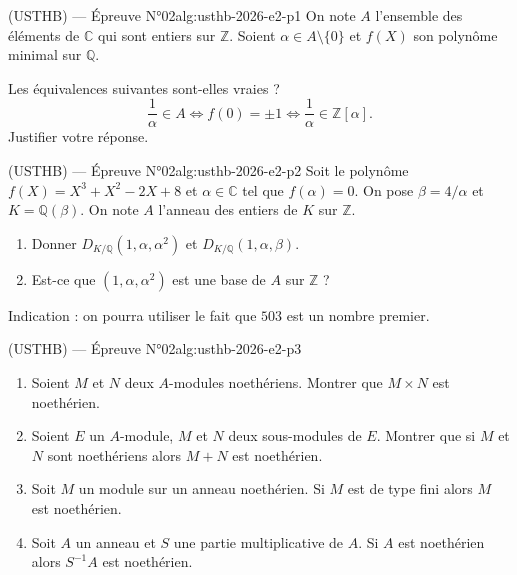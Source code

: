 \newpage

\begin{problem}{(USTHB) — Épreuve N°02}{alg:usthb-2026-e2-p1}
On note $A$ l'ensemble des éléments de $\mathbb{C}$ qui sont entiers sur
$\mathbb{Z}$. Soient $\alpha\in A\setminus\{0\}$ et $f(X)$ son polynôme minimal sur
$\mathbb{Q}$.

Les équivalences suivantes sont-elles vraies ?
$$
\frac1\alpha\in A\Longleftrightarrow f(0)=\pm1\Longleftrightarrow\frac1\alpha\in\mathbb{Z}[\alpha].
$$
Justifier votre réponse.

\end{problem}

\newpage

\begin{problem}{(USTHB) — Épreuve N°02}{alg:usthb-2026-e2-p2}
Soit le polynôme $f(X)=X^3+X^2-2X+8$ et $\alpha\in\mathbb{C}$ tel que
$f(\alpha)=0$. On pose $\beta=4/\alpha$ et $K=\mathbb{Q}(\beta)$. On note $A$
l'anneau des entiers de $K$ sur $\mathbb{Z}$.
\begin{enumerate}
\item Donner $D_{K/\mathbb{Q}}(1,\alpha,\alpha^2)$ et
      $D_{K/\mathbb{Q}}(1,\alpha,\beta)$.
\item Est-ce que $(1,\alpha,\alpha^2)$ est une base de $A$ sur $\mathbb{Z}$ ?
\end{enumerate}
Indication : on pourra utiliser le fait que $503$ est un nombre premier.

\end{problem}

\newpage

\begin{problem}{(USTHB) — Épreuve N°02}{alg:usthb-2026-e2-p3}
\begin{enumerate}
\item Soient $M$ et $N$ deux $A$-modules noethériens. Montrer que $M\times N$ est
      noethérien.
\item Soient $E$ un $A$-module, $M$ et $N$ deux sous-modules de $E$. Montrer que si
      $M$ et $N$ sont noethériens alors $M+N$ est noethérien.
\item Soit $M$ un module sur un anneau noethérien. Si $M$ est de type fini alors
      $M$ est noethérien.
\item Soit $A$ un anneau et $S$ une partie multiplicative de $A$. Si $A$ est
      noethérien alors $S^{-1}A$ est noethérien.
\end{enumerate}

\end{problem}

